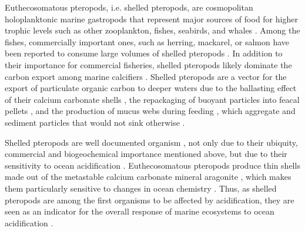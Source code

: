 








Euthecosomatous pteropods, i.e. shelled pteropods, are cosmopolitan holoplanktonic marine gastropods \citep{Bednarsek2012PteropodDistribution,SuarezMorales2009Gastropods} that represent major sources of food for higher trophic levels such as other zooplankton, fishes, seabirds, and whales \citep[][]{FalkPetersen2001Trophic,Hunt2008TopPredators}.
Among the fishes, commercially important ones, such as herring, mackarel, or salmon have been reported to consume large volumes of shelled pteropods \citep{LeBrasseur1966FishPteropods,lalli1989pelagic}.
In addition to their importance for commercial fisheries, shelled pteropods likely dominate the carbon export among marine calcifiers \citep{Buitenhuis2019CalciteExportPteropods}. Shelled pteropods are a vector for the export of particulate organic carbon to deeper waters due to the ballasting effect of their calcium carbonate shells \citep{Klaas2002Ballast}, the repackaging of buoyant particles into feacal pellets \citep{Treguer2003FecalPellets,Manno2009FeacalPellets}, and the production of mucus webs during feeding \citep{Gilmer1972FeedingBehaviour}, which aggregate and sediment particles that would not sink otherwise \citep{Noji1997Aggregation}.

Shelled pteropods are well documented organism \citep{Bednarsek2017ApplicationPteropodShell}, not only due to their ubiquity, commercial and biogeochemical importance mentioned above, but due to their sensitivity to ocean acidification \citep{Bednarsek2017ApplicationPteropodShell,Manno2017ReviewPteropodVulnerability}.
Euthecosomatous pteropods produce thin shells made out of the metastable calcium carbonate mineral aragonite \citep{Mucci1983Metastable,lalli1989pelagic}, which makes them particularly sensitive to changes in ocean chemistry \citep[][]{Orr2005Acidification,Bednarsek2014LimacinaHelicina}.
Thus, as shelled pteropods are among the first organisms to be affected by acidification, they are seen as an indicator for the overall response of marine ecosystems to ocean acidification \citep{Bednarsek2017ApplicationPteropodShell}. 

